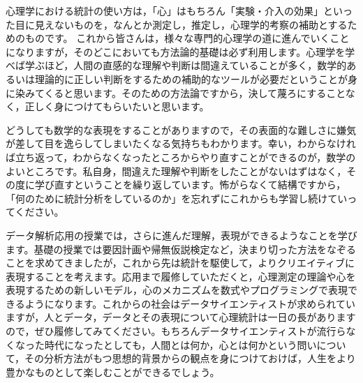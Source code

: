 \documentclass{ltjbook}
\begin{document}
心理学における統計の使い方は，「心」はもちろん「実験・介入の効果」といった目に見えないものを，なんとか測定し，推定し，心理学的考察の補助とするためのものです。
これから皆さんは，様々な専門的心理学の道に進んでいくことになりますが，そのどこにおいても方法論的基礎は必ず利用します。心理学を学べば学ぶほど，人間の直感的な理解や判断は間違えていることが多く，数学的あるいは理論的に正しい判断をするための補助的なツールが必要だということが身に染みてくると思います。そのための方法論ですから，決して蔑ろにすることなく，正しく身につけてもらいたいと思います。

どうしても数学的な表現をすることがありますので，その表面的な難しさに嫌気が差して目を逸らしてしまいたくなる気持ちもわかります。幸い，わからなければ立ち返って，わからなくなったところからやり直すことができるのが，数学のよいところです。私自身，間違えた理解や判断をしたことがないはずはなく，その度に学び直すということを繰り返しています。怖がらなくて結構ですから，「何のために統計分析をしているのか」を忘れずにこれからも学習し続けていってください。


データ解析応用の授業では，さらに進んだ理解，表現ができるようなことを学びます。基礎の授業では要因計画や帰無仮説検定など，決まり切った方法をなぞることを求めてきましたが，これから先は統計を駆使して，よりクリエイティブに表現することを考えます。応用まで履修していただくと，心理測定の理論や心を表現するための新しいモデル，心のメカニズムを数式やプログラミングで表現できるようになります。これからの社会はデータサイエンティストが求められていますが，人とデータ，データとその表現について心理統計は一日の長がありますので，ぜひ履修してみてください。もちろんデータサイエンティストが流行らなくなった時代になったとしても，人間とは何か，心とは何かという問いについて，その分析方法がもつ思想的背景からの観点を身につけておけば，人生をより豊かなものとして楽しむことができるでしょう。
\end{document}
